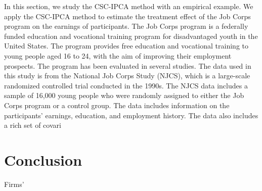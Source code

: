 \documentclass[12pt]{article}
\begin{document}
In this section, we study the CSC-IPCA method with an empirical example. We apply the CSC-IPCA method to estimate the treatment effect of the Job Corps program on the earnings of participants. The Job Corps program is a federally funded education and vocational training program for disadvantaged youth in the United States. The program provides free education and vocational training to young people aged 16 to 24, with the aim of improving their employment prospects. The program has been evaluated in several studies. The data used in this study is from the National Job Corps Study (NJCS), which is a large-scale randomized controlled trial conducted in the 1990s. The NJCS data includes a sample of 16,000 young people who were randomly assigned to either the Job Corps program or a control group. The data includes information on the participants' earnings, education, and employment history. The data also includes a rich set of covari
\section{Conclusion} 
\label{sec: conclusion}

Firms' 

\clearpage
\begingroup
{}


\endgroup

\clearpage
\appendix
{}
\renewcommand{\theequation}{\thesection.\arabic{equation}}
\setcounter{equation}{0}
\renewcommand{\theassumption}{\thesection.\arabic{assumption}}
\setcounter{assumption}{1}

\section{}
\end{document}
